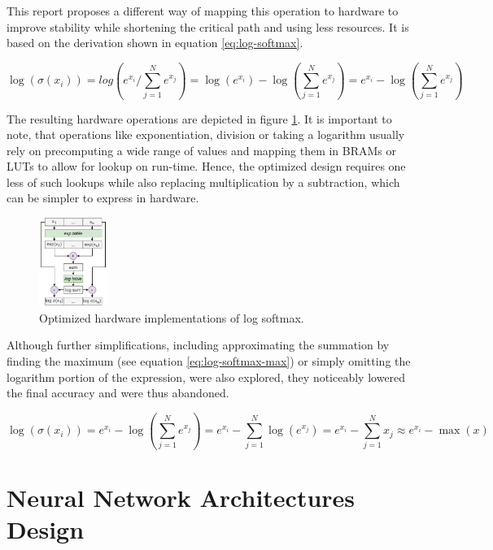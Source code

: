 This report proposes a different way of mapping this operation to hardware to improve stability while shortening the critical path and using less resources. It is based on the derivation shown in equation \ref{eq:log-softmax}.

\begin{equation} \label{eq:log-softmax}
    \log (\sigma (x_i)) = log(e^{x_i} / \sum_{j=1}^{N} e^{x_j}) = \log(e^{x_i}) - \log(\sum_{j=1}^{N} e^{x_j}) = e^{x_i} - \log(\sum_{j=1}^{N} e^{x_j})
\end{equation}

The resulting hardware operations are depicted in figure \ref{fig:log-softmax-opt}. It is important to note, that operations like exponentiation, division or taking a logarithm usually rely on precomputing a wide range of values and mapping them in BRAMs or LUTs to allow for lookup on run-time. Hence, the optimized design requires one less of such lookups while also replacing multiplication by a subtraction, which can be simpler to express in hardware.

\begin{figure}[hpt!]
  \centering
  \includegraphics[trim={0cm 0cm 0cm 0cm}, width=0.2\textwidth, center]{models/log_softmax_opt.pdf}
  \caption{Optimized hardware implementations of log softmax.}
  \label{fig:log-softmax-opt}
\end{figure}

Although further simplifications, including approximating the summation by finding the maximum (see equation \ref{eq:log-softmax-max}) or simply omitting the logarithm portion of the expression, were also explored, they noticeably lowered the final accuracy and were thus abandoned.

\begin{equation} \label{eq:log-softmax-max}
    \log (\sigma (x_i)) = e^{x_i} - \log(\sum_{j=1}^{N} e^{x_j}) = e^{x_i} - \sum_{j=1}^{N} \log(e^{x_j}) = e^{x_i} - \sum_{j=1}^{N} x_j \approx e^{x_i} - \max(x)
\end{equation}


\section{Neural Network Architectures Design}

